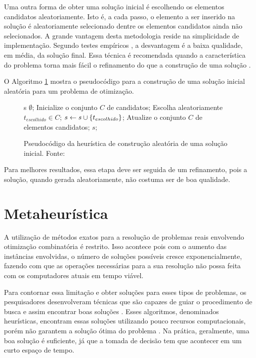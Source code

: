 Uma outra forma de obter uma solução inicial é escolhendo os elementos
candidatos aleatoriamente. Isto é, a cada passo, o elemento a ser inserido na
solução é aleatoriamente selecionado dentre os elementos candidatos
ainda não selecionados. A grande vantagem desta metodologia reside na
simplicidade de implementação. Segundo testes empíricos , a desvantagem é a
baixa qualidade, em média, da solução final. Essa técnica é recomendada quando
a característica do problema torna mais fácil o refinamento do que a construção
de uma solução \cite{notasmarcone}.

O Algoritmo \ref{alg:heurconsaleatoria} mostra o pseudocódigo para a construção
de uma solução inicial aleatória para um problema de otimização.

\begin{figure}[h]
\caption{Pseudocódigo da heurística de construção aleatória de uma
solução inicial. \newline \mbox{Fonte:
\cite{notasmarcone}}}\label{alg:heurconsaleatoria}
\begin{programma}
\STATE s \GETS $\emptyset$;
\STATE Inicialize o conjunto $C$ de candidatos;
\STATE Escolha aleatoriamente $t_{escolhido} \in C$;
\STATE $s \leftarrow s \cup \{t_{escolhido}\}$;
\STATE Atualize o conjunto $C$ de elementos candidatos;
\ENDWHILE
\STATE\RETURN $s$;
\ENDALGORITHM
\end{programma}
\end{figure}

Para melhores resultados, essa etapa deve ser seguida de um refinamento, pois a
solução, quando gerada aleatoriamente, não costuma ser de boa qualidade.

\section{Metaheurística}

A utilização de métodos exatos para a resolução de problemas reais envolvendo
otimização combinatória é restrito. Isso acontece pois com o aumento das
instâncias envolvidas, o número de soluções possíveis cresce exponencialmente,
fazendo com que as operações necessárias para a sua resolução não possa feita
com os computadores atuais em tempo viável.

Para contornar essa limitação e obter soluções para esses tipos de problemas,
os pesquisadores desenvolveram técnicas que são capazes de guiar o procedimento
de busca e assim encontrar boas soluções \cite{maritan2009}. Esses algoritmos,
denominados heurísticas, encontram essas soluções utilizando pouco recursos
computacionais, porém não garantem a solução ótima do problema \cite{dias2006}.
Na prática, geralmente, uma boa solução é suficiente, já que a tomada de
decisão tem que acontecer em um curto espaço de tempo.


